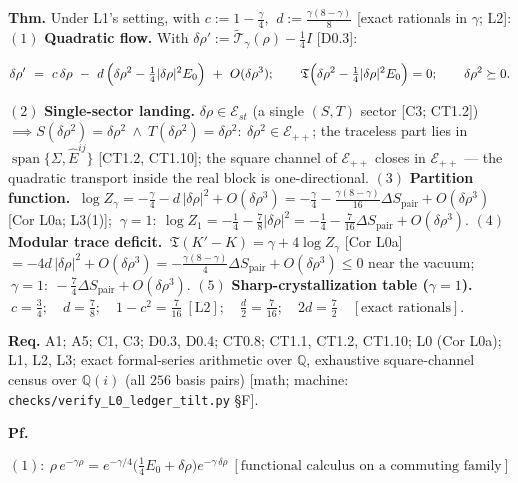 \begin{theorem}\label{tag:L5}
\textbf{Thm.} Under L1's setting, with $c:=1-\tfrac\gamma4$, $\ d:=\tfrac{\gamma(8-\gamma)}8$ [exact rationals in $\gamma$; L2]: $(1)$ \textbf{Quadratic flow.} With $\delta\rho':=\tilde{\mathcal T}_\gamma(\rho)-\tfrac14I$ [D0.3]:

\[
\delta\rho'\ =\ c\,\delta\rho\ -\ d\,\Bigl(\delta\rho^2-\tfrac14|\delta\rho|^2E_0\Bigr)\ +\ O(\delta\rho^3);\qquad
\mathfrak T\Bigl(\delta\rho^2-\tfrac14|\delta\rho|^2E_0\Bigr)=0;\qquad
\delta\rho^2\succeq0 .
\]

$(2)$ \textbf{Single-sector landing.} $\delta\rho\in\mathcal E_{st}$ (a single $(S,T)$ sector [C3; CT1.2]) $\implies S(\delta\rho^2)=\delta\rho^2\ \wedge\ T(\delta\rho^2)=\delta\rho^2:\ \delta\rho^2\in\mathcal E_{++}$; the traceless part lies in $\operatorname{span}\{\Sigma,\hat E^{ij}\}$ [CT1.2, CT1.10]; the square channel of $\mathcal E_{++}$ closes in $\mathcal E_{++}$ — the quadratic transport inside the real block is one-directional. $(3)$ \textbf{Partition function.} $\ \log Z_\gamma=-\tfrac\gamma4-d\,|\delta\rho|^2+O(\delta\rho^3)=-\tfrac\gamma4-\tfrac{\gamma(8-\gamma)}{16}\Delta S_{\mathrm{pair}}+O(\delta\rho^3)$ [Cor L0a; L3(1)]; $\ \gamma=1:\ \log Z_1=-\tfrac14-\tfrac78|\delta\rho|^2=-\tfrac14-\tfrac7{16}\Delta S_{\mathrm{pair}}+O(\delta\rho^3)$. $(4)$ \textbf{Modular trace deficit.} $\ \mathfrak T(K'-K)=\gamma+4\log Z_\gamma$ [Cor L0a] $=-4d\,|\delta\rho|^2+O(\delta\rho^3)=-\tfrac{\gamma(8-\gamma)}4\Delta S_{\mathrm{pair}}+O(\delta\rho^3)\le0$ near the vacuum; $\ \gamma=1:\ -\tfrac74\Delta S_{\mathrm{pair}}+O(\delta\rho^3)$. $(5)$ \textbf{Sharp-crystallization table ($\gamma=1$).} $\ c=\tfrac34;\quad d=\tfrac78;\quad1-c^2=\tfrac7{16}\ [\mathrm{L2}];\quad\tfrac d2=\tfrac7{16};\quad2d=\tfrac72\quad[\text{exact rationals}]$.

\textbf{Req.} A1; A5; C1, C3; D0.3, D0.4; CT0.8; CT1.1, CT1.2, CT1.10; L0 (Cor L0a); L1, L2, L3; exact formal-series arithmetic over $\mathbb Q$, exhaustive square-channel census over $\mathbb Q(i)$ (all $256$ basis pairs) [math; machine: \texttt{checks/\allowbreak{}verify\_\allowbreak{}L0\_\allowbreak{}ledger\_\allowbreak{}tilt.py} §F].

\textbf{Pf.}

\[
(1):\ \rho\,e^{-\gamma\rho}=e^{-\gamma/4}\bigl(\tfrac14E_0+\delta\rho\bigr)e^{-\gamma\,\delta\rho}\ [\text{functional calculus on a commuting family}]
\]


\end{theorem}
